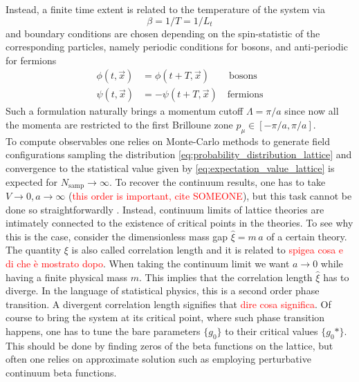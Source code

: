 Instead, a finite time extent is related to the temperature of the system \cite{le_bellac_1996,rothe_LGT} via
\begin{equation*}
    \beta = 1/T = 1/L_t
\end{equation*}
and boundary conditions are chosen depending on the spin-statistic of the corresponding particles, namely periodic conditions for bosons, and anti-periodic for fermions
\begin{equation*}
    \begin{aligned}
        \phi(t, \vec x) &= \phi(t + T, \vec x) \qquad \text{bosons}\\
        \psi(t, \vec x) &= -\psi(t + T, \vec x) \quad \text{fermions}
    \end{aligned}
\end{equation*}
Such a formulation naturally brings a momentum cutoff $\Lambda = \pi/a$ since now all the momenta are restricted to the first Brilloune zone $p_\mu \in [-\pi/a, \pi/a]$. \\
To compute observables one relies on Monte-Carlo methods to generate field configurations sampling the distribution \eqref{eq:probability_distribution_lattice} and convergence to the statistical value given by \eqref{eq:expectation_value_lattice} is expected for $N_\text{samp} \to \infty$. To recover the continuum results, one has to take $V \to 0, a \to \infty$ (\textcolor{red}{this order is important, cite SOMEONE}), but this task cannot be done so straightforwardly \cite{rothe_LGT}.
Instead, continuum limits of lattice theories are intimately connected to the existence of critical points in the theories. To see why this is the case, consider the dimensionless mass gap $\hat\xi = m \, a$ of a certain theory. The quantity $\xi$ is also called correlation length and it is related to \textcolor{red}{spigea cosa e di che è mostrato dopo}. 
When taking the continuum limit we want $a \to 0$ while having a finite physical mass $m$. This implies that the correlation length $\hat \xi$ has to diverge. In the language of statistical physics, this is a second order phase transition. A divergent correlation length signifies that \textcolor{red}{dire cosa significa}. Of course to bring the system at its critical point, where such phase transition happens, one has to tune the bare parameters $\{g_0\}$ to their critical values $\{g_0*\}$. 
This should be done by finding zeros of the beta functions on the lattice, but often one relies on approximate solution such as employing perturbative continuum beta functions. \\
